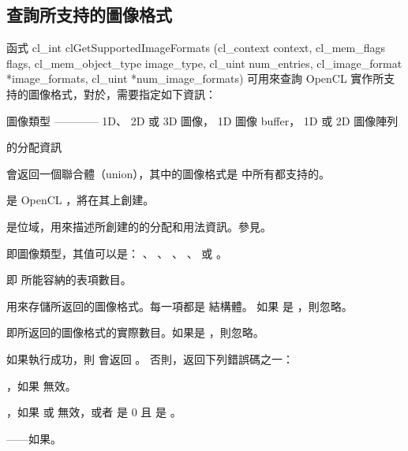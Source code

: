 \subsection{查詢所支持的圖像格式}

函式
\startCLFUNC
cl_int clGetSupportedImageFormats (cl_context context,
			cl_mem_flags flags,
			cl_mem_object_type image_type,
			cl_uint num_entries,
			cl_image_format *image_formats,
			cl_uint *num_image_formats)
\stopCLFUNC
可用來查詢 OpenCL 實作所支持的圖像格式，對於，需要指定如下資訊：
\startigBase
\item {}
\item 圖像類型 ———— 1D、 2D 或 3D 圖像， 1D 圖像 buffer， 1D 或 2D 圖像陣列
\item {}的分配資訊
\stopigBase

 會返回一個聯合體（union），其中的圖像格式是  中所有都支持的。

 是 OpenCL ，將在其上創建。

 是位域，用來描述所創建的的分配和用法資訊。參見。

 即圖像類型，其值可以是：
 、 、
 、 、
  或 。

 即  所能容納的表項數目。

 用來存儲所返回的圖像格式。每一項都是  結構體。
如果  是 ，則忽略。

 即所返回的圖像格式的實際數目。如果是 ，則忽略。

如果執行成功，則  會返回 。
否則，返回下列錯誤碼之一：

\startigBase
\item {}，如果  無效。

\item {}，如果  或  無效，或者  是 0 且  是 。

\item {}——如果\scdevfailres。

